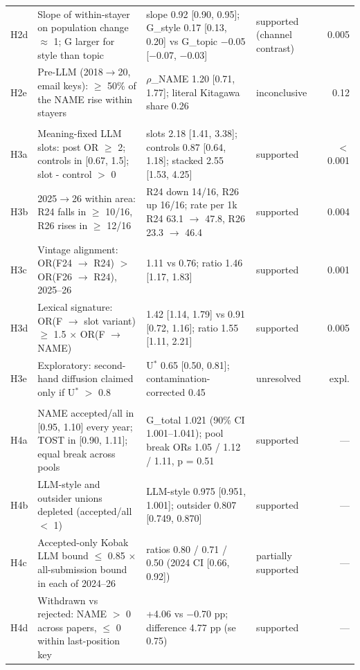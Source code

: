 \begin{table}[t]
\begin{tabular}{l p{3.9cm} p{5.7cm} p{2.3cm} r}
H2d & Slope of within-stayer on population change $\approx$ 1; G larger for style than topic & slope 0.92 [0.90, 0.95]; G\_style 0.17 [0.13, 0.20] vs G\_topic $-$0.05 [$-$0.07, $-$0.03] & supported (channel contrast) & 0.005 \\
H2e & Pre-LLM (2018$\rightarrow$20, email keys): $\geq$ 50\% of the NAME rise within stayers & $\rho$\_NAME 1.20 [0.71, 1.77]; literal Kitagawa share 0.26 & inconclusive & 0.12 \\
\addlinespace
\multicolumn{5}{l}{\textit{D3 The machine register}} \\
H3a & Meaning-fixed LLM slots: post OR $\geq$ 2; controls in [0.67, 1.5]; slot - control $>$ 0 & slots 2.18 [1.41, 3.38]; controls 0.87 [0.64, 1.18]; stacked 2.55 [1.53, 4.25] & supported & $<$0.001 \\
H3b & 2025$\rightarrow$26 within area: R24 falls in $\geq$ 10/16, R26 rises in $\geq$ 12/16 & R24 down 14/16, R26 up 16/16; rate per 1k R24 63.1 $\rightarrow$ 47.8, R26 23.3 $\rightarrow$ 46.4 & supported & 0.004 \\
H3c & Vintage alignment: OR(F24 $\rightarrow$ R24) $>$ OR(F26 $\rightarrow$ R24), 2025--26 & 1.11 vs 0.76; ratio 1.46 [1.17, 1.83] & supported & 0.001 \\
H3d & Lexical signature: OR(F $\rightarrow$ slot variant) $\geq$ 1.5 $\times$ OR(F $\rightarrow$ NAME) & 1.42 [1.14, 1.79] vs 0.91 [0.72, 1.16]; ratio 1.55 [1.11, 2.21] & supported & 0.005 \\
H3e & Exploratory: second-hand diffusion claimed only if U$^{*}$ $>$ 0.8 & U$^{*}$ 0.65 [0.50, 0.81]; contamination-corrected 0.45 & unresolved & expl. \\
\addlinespace
\multicolumn{5}{l}{\textit{D4 The gatekeeper (2024--26 pooled)}} \\
H4a & NAME accepted/all in [0.95, 1.10] every year; TOST in [0.90, 1.11]; equal break across pools & G\_total 1.021 (90\% CI 1.001--1.041); pool break ORs 1.05 / 1.12 / 1.11, p = 0.51 & supported & --- \\
H4b & LLM-style and outsider unions depleted (accepted/all $<$ 1) & LLM-style 0.975 [0.951, 1.001]; outsider 0.807 [0.749, 0.870] & supported & --- \\
H4c & Accepted-only Kobak LLM bound $\leq$ 0.85 $\times$ all-submission bound in each of 2024--26 & ratios 0.80 / 0.71 / 0.50 (2024 CI [0.66, 0.92]) & partially supported & --- \\
H4d & Withdrawn vs rejected: NAME $>$ 0 across papers, $\leq$ 0 within last-position key & +4.06 vs $-$0.70 pp; difference 4.77 pp (se 0.75) & supported & --- \\

\end{tabular}
\end{table}
